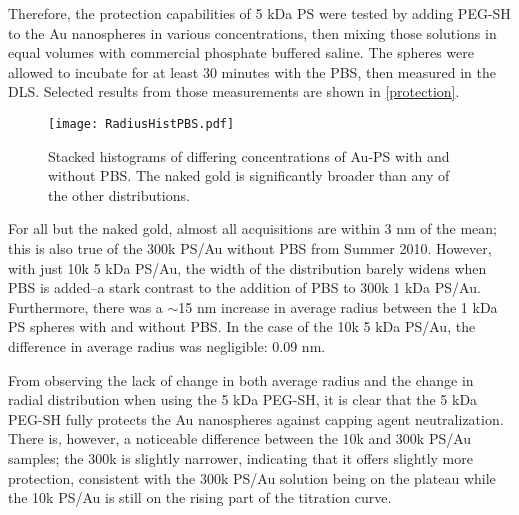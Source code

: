 Therefore, the protection capabilities of 5 kDa PS were tested by adding PEG-SH to the Au nanospheres in various concentrations, then mixing those solutions in equal volumes with commercial phosphate buffered saline. The spheres were allowed to incubate for at least 30 minutes with the PBS, then measured in the DLS. Selected results from those measurements are shown in \autoref{protection}.

\begin{figure}[htbp]
\centering
\texttt{[image: RadiusHistPBS.pdf]}
\caption{Stacked histograms of differing concentrations of Au-PS with and without PBS. The naked gold is significantly broader than any of the other distributions.}
\label{protection}
\end{figure}



For all but the naked gold, almost all acquisitions are within 3 nm of the mean; this is also true of the 300k PS\slash Au without PBS from Summer 2010. However, with just 10k 5 kDa PS\slash Au, the width of the distribution barely widens when PBS is added--a stark contrast to the addition of PBS to 300k 1 kDa PS\slash Au. Furthermore, there was a \ensuremath{\sim}15 nm increase in average radius between the 1 kDa PS spheres with and without PBS. In the case of the 10k 5 kDa PS\slash Au, the difference in average radius was negligible: 0.09 nm.

From observing the lack of change in both average radius and the change in radial distribution when using the 5 kDa PEG-SH, it is clear that the 5 kDa PEG-SH fully protects the Au nanospheres against capping agent neutralization. There is, however, a noticeable difference between the 10k and 300k PS\slash Au samples; the 300k is slightly narrower, indicating that it offers slightly more protection, consistent with the 300k PS\slash Au solution being on the plateau while the 10k PS\slash Au is still on the rising part of the titration curve.
